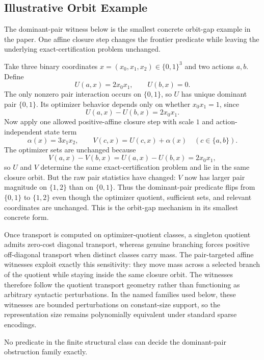 \subsection*{Illustrative Orbit Example}

The dominant-pair witness below is the smallest concrete orbit-gap example in the paper. One affine closure step changes the frontier predicate while leaving the underlying exact-certification problem unchanged.

Take three binary coordinates $x=(x_0,x_1,x_2) \in \{0,1\}^3$ and two actions $a,b$. Define
\[
U(a,x)=2x_0x_1,
\qquad
U(b,x)=0.
\]
The only nonzero pair interaction occurs on $\{0,1\}$, so $U$ has unique dominant pair $\{0,1\}$. Its optimizer behavior depends only on whether $x_0x_1=1$, since
\[
U(a,x)-U(b,x)=2x_0x_1.
\]
Now apply one allowed positive-affine closure step with scale $1$ and action-independent state term
\[
\alpha(x)=3x_1x_2,
\qquad
V(c,x)=U(c,x)+\alpha(x)
\quad (c\in\{a,b\}).
\]
The optimizer sets are unchanged because
\[
V(a,x)-V(b,x)=U(a,x)-U(b,x)=2x_0x_1,
\]
so $U$ and $V$ determine the same exact-certification problem and lie in the same closure orbit. But the raw pair statistics have changed: $V$ now has larger pair magnitude on $\{1,2\}$ than on $\{0,1\}$. Thus the dominant-pair predicate flips from $\{0,1\}$ to $\{1,2\}$ even though the optimizer quotient, sufficient sets, and relevant coordinates are unchanged. This is the orbit-gap mechanism in its smallest concrete form.

\begin{remark}\label{rem:transport-interpretation-affine-witnesses}
Once transport is computed on optimizer-quotient classes, a singleton quotient admits zero-cost diagonal transport, whereas genuine branching forces positive off-diagonal transport when distinct classes carry mass. The pair-targeted affine witnesses exploit exactly this sensitivity: they move mass across a selected branch of the quotient while staying inside the same closure orbit. The witnesses therefore follow the quotient transport geometry rather than functioning as arbitrary syntactic perturbations. In the named families used below, these witnesses are bounded perturbations on constant-size support, so the representation size remains polynomially equivalent under standard sparse encodings.
\end{remark}

\begin{theorem}\label{thm:dominant-pair-admissible-no-go}
No predicate in the finite structural class can decide the dominant-pair obstruction family exactly.
\end{theorem}

